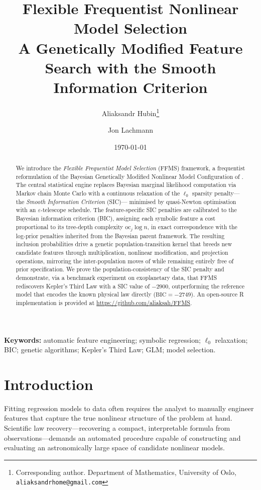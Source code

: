\documentclass[12pt,a4paper]{article}
\title{%
  \textbf{Flexible Frequentist Nonlinear Model Selection}\\[0.5em]
  \large A Genetically Modified Feature Search with the Smooth Information Criterion
}
\author{
  Aliaksandr Hubin\thanks{Corresponding author.
    Department of Mathematics, University of Oslo,
    \texttt{aliaksandrhome@gmail.com}}
  \and
  Jon Lachmann
}
\date{\today}
\newcommand{\oc}{\mathrm{oc}}
\newcommand{\BIC}{\mathrm{BIC}}
\begin{document}
\maketitle

\begin{abstract}
We introduce the \emph{Flexible Frequentist Model Selection} (FFMS) framework,
a frequentist reformulation of the Bayesian Genetically Modified
Nonlinear Model Configuration of \citet{Hubin2021JAIR}.
The central statistical engine replaces Bayesian marginal likelihood
computation via Markov chain Monte Carlo with a continuous relaxation of the
$\ell_0$ sparsity penalty---the \emph{Smooth Information Criterion} (SIC)---
minimised by quasi-Newton optimisation with an $\varepsilon$-telescope schedule.
The feature-specific SIC penalties are calibrated to the Bayesian information
criterion (BIC), assigning each symbolic feature a cost proportional to its
tree-depth complexity $\oc_j\log n$, in exact correspondence with the log-prior
penalties inherited from the Bayesian parent framework.
The resulting inclusion probabilities drive a genetic population-transition
kernel that breeds new candidate features through multiplication, nonlinear
modification, and projection operations, mirroring the inter-population moves of
\citet{Hubin2021JAIR} while remaining entirely free of prior specification.
We prove the population-consistency of the SIC penalty and demonstrate, via a
benchmark experiment on exoplanetary data, that FFMS rediscovers Kepler's Third
Law with a SIC value of $-2900$, outperforming the reference model that encodes
the known physical law directly ($\BIC=-2749$).
An open-source R implementation is provided at
\url{https://github.com/aliaksah/FFMS}.
\end{abstract}

\medskip
\noindent\textbf{Keywords:}
automatic feature engineering; symbolic regression; $\ell_0$ relaxation; BIC;
genetic algorithms; Kepler's Third Law; GLM; model selection.

\newpage
\tableofcontents
\newpage

\section{Introduction}
\label{sec:intro}

Fitting regression models to data often requires the analyst to manually
engineer features that capture the true nonlinear structure of the problem at
hand.  Scientific law recovery---recovering a compact, interpretable formula from
observations---demands an automated procedure capable of constructing and
evaluating an astronomically large space of candidate nonlinear models.
\end{document}
